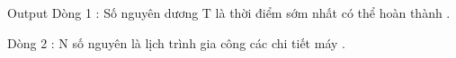 Output
Dòng 1 : Số nguyên dương T là thời điểm sớm nhất có thể hoàn thành .   


   Dòng 2 : N số nguyên là lịch trình gia công các chi tiết máy .